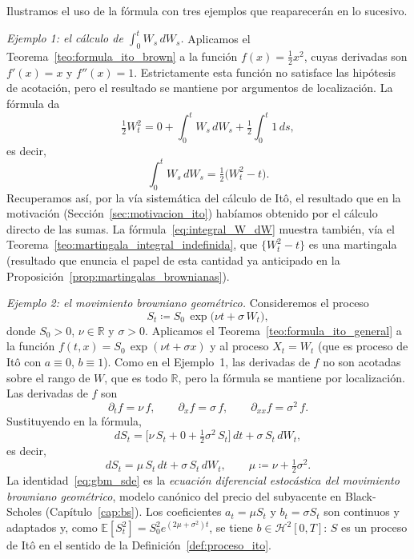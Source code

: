 \documentclass[11pt,a4paper,oneside]{report}
\theoremstyle{plain}
\theoremstyle{definition}
\theoremstyle{remark}
\newcommand{\R}{\mathbb{R}}
\newcommand{\E}{\mathbb{E}}
\newcommand{\1}{\mathbf{1}}
\newcommand{\eqdef}{\coloneqq}
\begin{document}
Ilustramos el uso de la fórmula con
tres ejemplos que reaparecerán en lo sucesivo.

\medskip

\noindent\textit{Ejemplo 1: el cálculo de $\int_0^t W_s\, dW_s$.}
Aplicamos el Teorema~\ref{teo:formula_ito_brown} a la función $f(x) =
\tfrac{1}{2} x^2$, cuyas derivadas son $f'(x) = x$ y $f''(x) = 1$.
Estrictamente esta función no satisface las hipótesis de acotación,
pero el resultado se mantiene por argumentos de localización. La fórmula da
\begin{equation*}
  \tfrac{1}{2} W_t^2 = 0 + \int_0^t W_s\, dW_s
                       + \tfrac{1}{2} \int_0^t 1\, ds,
\end{equation*}
es decir,
\begin{equation}\label{eq:integral_W_dW}
  \int_0^t W_s\, dW_s = \tfrac{1}{2}\bigl(W_t^2 - t\bigr).
\end{equation}
Recuperamos así, por la vía sistemática del cálculo de Itô, el
resultado que en la motivación
(Sección~\ref{sec:motivacion_ito}) habíamos obtenido por el cálculo
directo de las sumas. La fórmula~\eqref{eq:integral_W_dW} muestra
también, vía el Teorema~\ref{teo:martingala_integral_indefinida}, que
$\{W_t^2 - t\}$ es una martingala (resultado que enuncia el papel
de esta cantidad ya anticipado en la
Proposición~\ref{prop:martingalas_brownianas}).

\medskip

\noindent\textit{Ejemplo 2: el movimiento browniano geométrico.}
Consideremos el proceso
\begin{equation*}
  S_t \eqdef S_0\, \exp\bigl(\nu t + \sigma\, W_t\bigr),
\end{equation*}
donde $S_0 > 0$, $\nu \in \R$ y $\sigma > 0$. Aplicamos el
Teorema~\ref{teo:formula_ito_general} a la función $f(t, x) = S_0\,
\exp(\nu t + \sigma x)$ y al proceso $X_t = W_t$ (que es proceso de Itô
con $a \equiv 0$, $b \equiv 1$). Como en el Ejemplo~1, las derivadas de $f$ no son acotadas sobre el rango de $W$, que es todo $\R$, pero la fórmula se mantiene por localización. Las derivadas de $f$ son
\begin{equation*}
  \partial_t f = \nu\, f, \qquad
  \partial_x f = \sigma\, f, \qquad
  \partial_{xx} f = \sigma^2\, f.
\end{equation*}
Sustituyendo en la fórmula,
\begin{equation*}
  dS_t = \bigl[\nu\, S_t + 0 + \tfrac{1}{2} \sigma^2\, S_t\bigr]\, dt
        + \sigma\, S_t\, dW_t,
\end{equation*}
es decir,
\begin{equation}\label{eq:gbm_sde}
  \boxed{\; dS_t = \mu\, S_t\, dt + \sigma\, S_t\, dW_t, \qquad
  \mu \eqdef \nu + \tfrac{1}{2}\sigma^2. \;}
\end{equation}
La identidad~\eqref{eq:gbm_sde} es la \emph{ecuación diferencial
estocástica del movimiento browniano geométrico}, modelo canónico
del precio del subyacente en Black-Scholes
(Capítulo~\ref{cap:bs}). Los coeficientes $a_t = \mu S_t$ y $b_t = \sigma S_t$ son continuos y adaptados y, como $\E[S_t^2] = S_0^2 e^{(2\mu + \sigma^2) t}$, se tiene $b \in \mathcal{H}^2[0, T]$: $S$ es un proceso de Itô en el sentido de la Definición~\ref{def:proceso_ito}.
\end{document}
